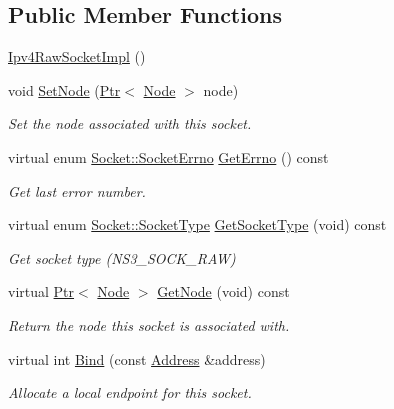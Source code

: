 \subsection*{Public Member Functions}
\begin{DoxyCompactItemize}
\item 
\hyperlink{classns3_1_1Ipv4RawSocketImpl_a05d9647c8aa25b5092c79f5efc3a056c}{Ipv4\+Raw\+Socket\+Impl} ()
\item 
void \hyperlink{classns3_1_1Ipv4RawSocketImpl_ac850bf9f93f91f53ed184c09d95cf371}{Set\+Node} (\hyperlink{classns3_1_1Ptr}{Ptr}$<$ \hyperlink{classns3_1_1Node}{Node} $>$ node)
\begin{DoxyCompactList}\small\item\em Set the node associated with this socket. \end{DoxyCompactList}\item 
virtual enum \hyperlink{classns3_1_1Socket_ada1328c5ae0c28cb2a982caf8f6d6cca}{Socket\+::\+Socket\+Errno} \hyperlink{classns3_1_1Ipv4RawSocketImpl_acfda80b470cc0359b70363f5dbc89a5a}{Get\+Errno} () const 
\begin{DoxyCompactList}\small\item\em Get last error number. \end{DoxyCompactList}\item 
virtual enum \hyperlink{classns3_1_1Socket_a698fbcc486a48b7a0d2b0e4ab863d571}{Socket\+::\+Socket\+Type} \hyperlink{classns3_1_1Ipv4RawSocketImpl_a38d738344a763f0aea530327034dc035}{Get\+Socket\+Type} (void) const 
\begin{DoxyCompactList}\small\item\em Get socket type (N\+S3\+\_\+\+S\+O\+C\+K\+\_\+\+R\+AW) \end{DoxyCompactList}\item 
virtual \hyperlink{classns3_1_1Ptr}{Ptr}$<$ \hyperlink{classns3_1_1Node}{Node} $>$ \hyperlink{classns3_1_1Ipv4RawSocketImpl_a7965179773962e28a388a1601e435d74}{Get\+Node} (void) const 
\begin{DoxyCompactList}\small\item\em Return the node this socket is associated with. \end{DoxyCompactList}\item 
virtual int \hyperlink{classns3_1_1Ipv4RawSocketImpl_a6edf52089c447383a89757569764d106}{Bind} (const \hyperlink{classns3_1_1Address}{Address} \&address)
\begin{DoxyCompactList}\small\item\em Allocate a local endpoint for this socket. \end{DoxyCompactList}\item 

\end{DoxyCompactItemize}
